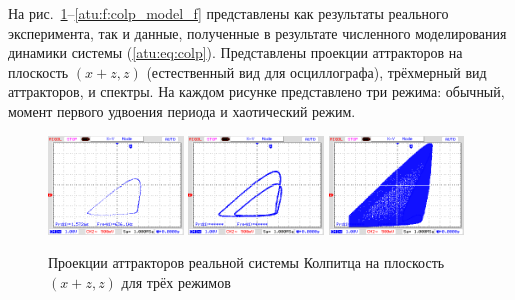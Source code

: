 На рис.~\ref{atu:f:colp_real_xzz}--\ref{atu:f:colp_model_f} представлены как результаты реального эксперимента,
так и данные, полученные в результате численного моделирования динамики системы (\ref{atu:eq:colp}).
Представлены проекции аттракторов на плоскость $(x+z,z)$ (естественный вид для осциллографа),
трёхмерный вид аттракторов, и спектры.
На каждом рисунке представлено три режима: обычный, момент первого удвоения периода и хаотический режим.


\begin{figure}[htb!]
 \centerline{
   \includegraphics[width=0.32\textwidth]{p/mod/colp_m1_vv.png}
   \includegraphics[width=0.32\textwidth]{p/mod/colp_m2_vv.png}
   \includegraphics[width=0.32\textwidth]{p/mod/colp_m3_vv_ac.png}
 }
  \caption{Проекции аттракторов реальной системы Колпитца на плоскость $(x+z,z)$
  для трёх режимов}
  \label{atu:f:colp_real_xzz}
\end{figure}

